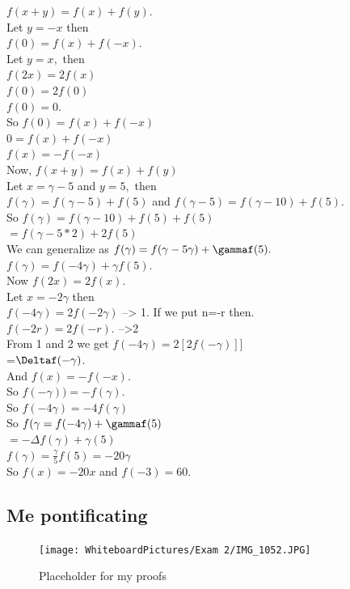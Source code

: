 $f(x+y)=f(x)+f(y).$ \\ 
Let $y=-x$ then \\ 
$f(0)=f(x)+f(-x).$ \\ 
Let $y=x,$ then \\ 
$f(2x)=2f(x)$ \\ 
$f(0)=2f(0)$ \\ $f(0)=0.$ \\
So $f(0)=f(x)+f(-x)$ \\ 
$0=f(x)+f(-x)$ \\ 
$f(x)=-f(-x)$\\ 
Now, $f(x+y)=f(x)+f(y)$ \\ 
Let $x= \gamma-5$ and $y=5,$ then \\ 
$f(\gamma)=f(\gamma-5)+f(5)$ and $f(\gamma-5)=f(\gamma-10)+f(5).$ \\ 
So $f(\gamma)= f(\gamma -10)+f(5)+f(5)$ \\ 
$= f(\gamma-5*2)+2f(5)$ \\ 
We can generalize as $f(\gamma)=f(\gamma-5\gamma)+\gammaf(5).$ \\ 
$f(\gamma)= f(-4 \gamma) + \gamma f(5).$ \\
Now $f(2x)=2f(x).$ \\ 
Let $x=-2\gamma$ then \\ 
$f(-4 \gamma)=2 f(-2 \gamma)$ --> 1. 
If we put n=-r then. \\ 
$f(-2r)=2f(-r).$ -->2 \\ 
From 1 and 2 we get 
$f(-4 \gamma)=2[2f(-\gamma)]]$ \\ 
=$\Deltaf(-\gamma)$. \\ 
And $f(x)=-f(-x)$. \\ 
So $f(- \gamma))=-f(\gamma).$ \\ 
So $f(-4\gamma)=-4f(\gamma)$ \\ 
So $f(\gamma=f(-4 \gamma)+ \gammaf(5)$ \\
$= - \Delta f(\gamma) +\gamma(5)$ \\ 
$f(\gamma)=\frac{\gamma}{5}f(5)=-20 \gamma$ \\ 
So $f(x)=-20x$ and $f(-3)=60.$

\newpage 
\subsection*{Me pontificating}

\begin{figure}[h]\begin{center}\texttt{[image: WhiteboardPictures/Exam 2/IMG\_1052.JPG]}
\caption{Placeholder for my proofs} \label{fig:Euler_pic}\end{center}\end{figure} 

